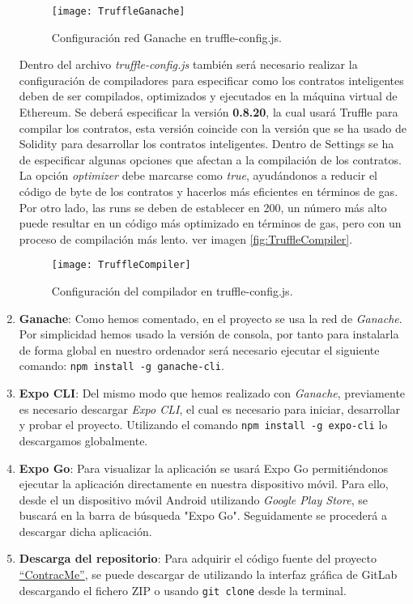 \begin{enumerate}
\begin{figure}[h]
	\label{img:TruffleGanache}
	\centering
	\texttt{[image: TruffleGanache]}
	\caption[Configuración Ganache Truffle]{Configuración red Ganache en truffle-config.js.}
\end{figure}

Dentro del archivo \textit{truffle-config.js} también será necesario realizar la configuración de compiladores para especificar como los contratos inteligentes deben de ser compilados, optimizados y ejecutados en la máquina virtual de Ethereum.
Se deberá especificar la versión \textbf{0.8.20}, la cual usará Truffle para compilar los contratos, esta versión coincide con la versión que se ha usado de Solidity para desarrollar los contratos inteligentes.
Dentro de Settings se ha de especificar algunas opciones que afectan a la compilación de los contratos. La opción \textit{optimizer} debe marcarse como \textit{true}, ayudándonos a reducir el código de byte de los contratos y hacerlos más eficientes en términos de gas.
Por otro lado, las runs se deben de establecer en 200, un número más alto puede resultar en un código más optimizado en términos de gas, pero con un proceso de compilación más lento. ver imagen \ref{fig:TruffleCompiler}.

\begin{figure}[h]
	\label{img:TruffleCompiler}
	\centering
	\texttt{[image: TruffleCompiler]}
	\caption[Configuración compilador Truffle]{Configuración del compilador en truffle-config.js.}
\end{figure}

\item \textbf{Ganache}: Como hemos comentado, en el proyecto se usa la red de \textit{Ganache}. Por simplicidad hemos usado la versión de consola, por tanto para instalarla de forma global en nuestro ordenador será necesario ejecutar el siguiente comando: \texttt{npm install -g ganache-cli}.

\item \textbf{Expo CLI}: Del mismo modo que hemos realizado con \textit{Ganache}, previamente es necesario descargar \textit{Expo CLI}, el cual es necesario para iniciar, desarrollar y probar el proyecto.
Utilizando el comando \texttt{npm install -g expo-cli} lo descargamos globalmente.

\item \textbf{Expo Go}: Para visualizar la aplicación se usará Expo Go permitiéndonos ejecutar la aplicación directamente en nuestra dispositivo móvil.
Para ello, desde el un dispositivo móvil Android utilizando \textit{Google Play Store}, se buscará en la barra de búsqueda "Expo Go".  Seguidamente se procederá a descargar dicha aplicación.

\item \textbf{Descarga del repositorio}: Para adquirir el código fuente del proyecto \href{https://gitlab.com/HP-SCDS/Observatorio/2023-2024/contractme/ubu-contractme.git}{``ContracMe''}, se puede descargar de utilizando la interfaz gráfica de GitLab descargando el fichero ZIP o usando \texttt{git clone} desde la terminal.

\end{enumerate}


